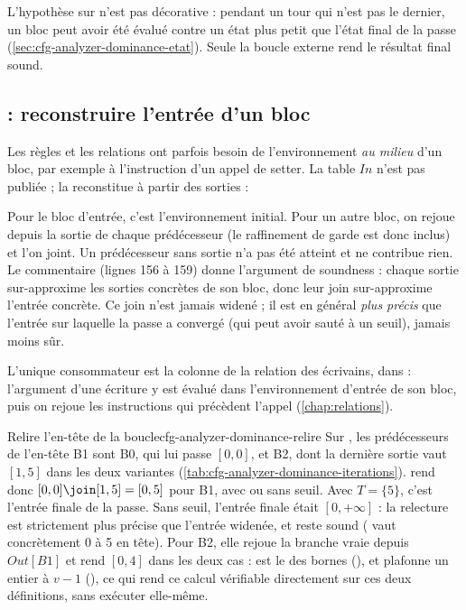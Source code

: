 L'hypothèse sur  n'est pas décorative : pendant un tour qui
n'est pas le dernier, un bloc peut avoir été évalué contre un état plus petit
que l'état final de la passe (\cref{sec:cfg-analyzer-dominance-etat}). Seule
la boucle externe rend le résultat final sound.

\subsection{ : reconstruire l'entrée d'un bloc}

Les règles et les relations ont parfois besoin de l'environnement
\emph{au milieu} d'un bloc, par exemple à l'instruction d'un appel de setter.
La table $\mathit{In}$ n'est pas publiée ;  la reconstitue
à partir des sorties :


Pour le bloc d'entrée, c'est l'environnement initial. Pour un autre bloc, on
rejoue  depuis la sortie de chaque prédécesseur (le raffinement
de garde est donc inclus) et l'on joint. Un prédécesseur sans sortie n'a pas
été atteint et ne contribue rien. Le commentaire (lignes 156 à 159) donne
l'argument de soundness : chaque sortie sur-approxime les sorties concrètes de
son bloc, donc leur join sur-approxime l'entrée concrète. Ce join n'est jamais
widené ; il est en général \emph{plus précis} que l'entrée sur laquelle la
passe a convergé (qui peut avoir sauté à un seuil), jamais moins sûr.

L'unique consommateur est la colonne  de la relation des
écrivains, dans  : l'argument d'une écriture
y est évalué dans l'environnement d'entrée de son bloc, puis on rejoue les
instructions qui précèdent l'appel (\cref{chap:relations}).

\begin{exemple}{Relire l'en-tête de la boucle}{cfg-analyzer-dominance-relire}
  Sur , les prédécesseurs de l'en-tête B1 sont B0,
  qui lui passe $[0,0]$, et B2, dont la dernière sortie vaut $[1,5]$ dans
  les deux variantes (\cref{tab:cfg-analyzer-dominance-iterations}).
   rend donc $[0,0] \join [1,5] = [0,5]$ pour B1, avec ou
  sans seuil. Avec $T = \{5\}$, c'est l'entrée finale de la passe. Sans
  seuil, l'entrée finale était $[0,+\infty]$ : la relecture est strictement
  plus précise que l'entrée widenée, et reste sound ( vaut
  concrètement 0 à 5 en tête). Pour B2, elle rejoue la branche vraie depuis
  $\mathit{Out}[B1]$ et rend $[0,4]$ dans les deux cas :  est le
   des bornes (), et
   plafonne un entier à $v - 1$
  (), ce qui rend ce calcul
  vérifiable directement sur ces deux définitions, sans exécuter
   elle-même.
\end{exemple}

